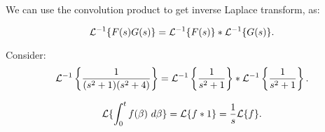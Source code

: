 \documentclass[../main/main.tex]{subfiles}
\begin{document}
We can use the convolution product to get inverse Laplace transform, as: 
\begin{theorem}
	 \[
		 \mathcal{L}^{-1} \{F(s)G(s)\} = \mathcal{L}^{-1} \{F(s)\} *\mathcal{L} ^{-1} \{G(s)\} 
	.\] 
\end{theorem}
\begin{example}
	Consider: \[
		\mathcal{L}^{-1} \left\{ \frac{1}{(s^2+1)(s^2+4)}\right\} = \mathcal{L}^{-1} \left\{\frac{1}{s^2+1}\right\} * \mathcal{L} ^{-1} \left\{\frac{1}{s^2+1}\right\} 
	.\] 
\end{example}
\begin{remark}
	\[
		\mathcal{L} \{\int^t_0 f(\beta)~d\beta\} = \mathcal{L} \{f*1\} = \frac{1}{s}\mathcal{L} \{f\}  
	.\] 
\end{remark}
\end{document}
